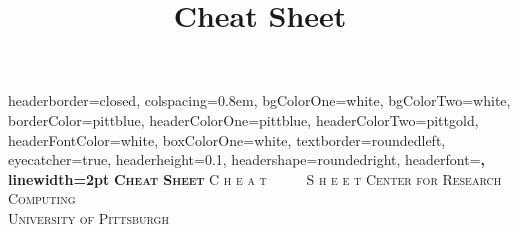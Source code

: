\documentclass[landscape,a0paper,fontscale=0.285]{baposter} %
\title{Cheat Sheet}
\begin{document}
\begin{poster}
{
 headerborder=closed, %
 colspacing=0.8em, %
 bgColorOne=white, %
 bgColorTwo=white, %
 borderColor=pittblue, %
 headerColorOne=pittblue, %
 headerColorTwo=pittgold, %
 headerFontColor=white, %
 boxColorOne=white, %
 textborder=roundedleft, %
 eyecatcher=true, %
 headerheight=0.1\textheight, %
 headershape=roundedright, %
 headerfont=\Large\bf\textsc, %
 linewidth=2pt %
}
{\bf\textsc{Cheat Sheet}\vspace{0.5em}} %
{\textsc{C h e a t \ \ \ \ \ S h e e t \hspace{12pt}}}
{\textsc{Center for Research Computing \\ University of Pittsburgh \hspace{12pt}}} 

\end{poster}
\end{document}
